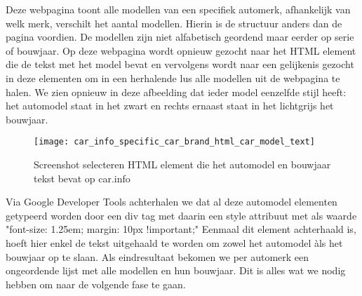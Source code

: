 Deze webpagina toont alle modellen van een specifiek automerk, afhankelijk van welk merk, verschilt het aantal modellen. Hierin is de structuur anders dan de pagina voordien. De modellen zijn niet alfabetisch geordend maar eerder op serie of bouwjaar. Op deze webpagina wordt opnieuw gezocht naar het HTML element die de tekst met het model bevat en vervolgens wordt naar een gelijkenis gezocht in deze elementen om in een herhalende lus alle modellen uit de webpagina te halen.
We zien opnieuw in deze afbeelding dat ieder model eenzelfde stijl heeft: het automodel staat in het zwart en rechts ernaast staat in het lichtgrijs het bouwjaar.

\begin{figure}[H]
	\centering
	\texttt{[image: car\_info\_specific\_car\_brand\_html\_car\_model\_text]}
	\caption{Screenshot selecteren HTML element die het automodel en bouwjaar tekst bevat op car.info}
\end{figure}

Via Google Developer Tools achterhalen we dat al deze automodel elementen getypeerd worden door een div tag met daarin een style attribuut met als waarde "font-size: 1.25em; margin: 10px !important;" 
Eenmaal dit element achterhaald is, hoeft hier enkel de tekst uitgehaald te worden om zowel het automodel àls het bouwjaar op te slaan.
Als eindresultaat bekomen we per automerk een ongeordende lijst met alle modellen en hun bouwjaar. Dit is alles wat we nodig hebben om naar de volgende fase te gaan.

